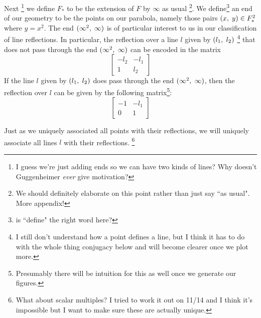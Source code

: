 \documentclass[12pt]{article}
\newcommand{\ttc}{, \hspace{1mm}}
\newcommand{\linenoendmat}[2]{\begin{bmatrix} -{#2} & -{#1} \\ 1 & {#2} \end{bmatrix}}
\newcommand{\stanlinenoendmat}{\linenoendmat{l_1}{l_2}}
\newcommand{\lineendmat}[2]{\begin{bmatrix} -1 & -{#1} \\ 0 & 1 \end{bmatrix}}
\newcommand{\stanlineendmat}{\lineendmat{l_1}{l_2}}
\newcommand{\specialend}{(\infty^2\ttc\infty)}
\theoremstyle{plain}
\theoremstyle{definition}
\begin{document}
Next \footnote{I guess we're just adding ends so we can have two kinds of lines? Why doesn't Guggenheimer \textit{ever} give motivation?} we define $F_*$ to be the extension of $F$ by $\infty$ as usual \footnote{We should definitely elaborate on this point rather than just say ``as usual". More appendix!}. We define\footnote{is ``define" the right word here?} an end of our geometry to be the points on our parabola, namely those pairs $(x \ttc y) \in F_*^2$ where $y = x^2$. The end $\specialend$ is of particular interest to us in our classification of line reflections. In particular, the reflection over a line $l$ given by $(l_1\ttc l_2)$ \footnote{I still don't understand how a point defines a line, but I think it has to do with the whole thing conjugacy below and will become clearer once we plot more.} that does not pass through the end $\specialend$ can be encoded in the matrix
\[\stanlinenoendmat\]
If the line $l$ given by $(l_1\ttc l_2)$ does pass through the end $\specialend$, then the reflection over $l$ can be given by the following matrix\footnote{Presumably there will be intuition for this as well once we generate our figures.}:
\[
	\stanlineendmat
\]

Just as we uniquely associated all points with their reflections, we will uniquely associate all lines $l$ with their reflections. \footnote{What about scalar multiples? I tried to work it out on 11/14 and I think it's impossible  but I want to make sure these are actually unique.} 
\end{document}
